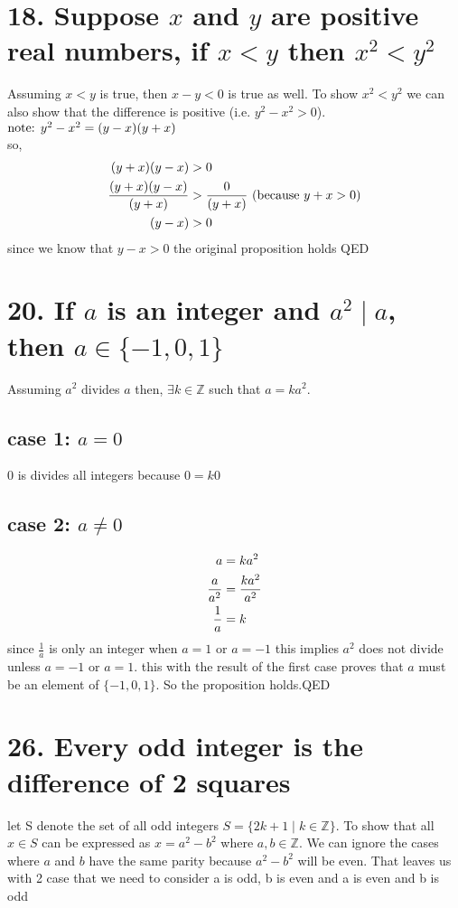 \documentclass{article}
\begin{document}
\section*{18. Suppose $x$ and $y$ are positive real numbers, if $x < y$ then $x^2 < y^2 $ }
Assuming $x < y $ is true, then $x-y < 0$ is true as well. To show $x^2 < y^2$ we can also show that the difference is positive (i.e. $y^2-x^2>0$).
 $\text{note: \hfil} y^2-x^2 =(y-x)(y+x)$ \\
 so,  
\begin{equation}\notag
 	\begin{aligned}
 		(y+x)(y-x)&>0\\
 		\frac{(y+x)(y-x)}{(y+x)}&>\frac{0}{(y+x)} \text{ (because $y+x>0$)}\\
 		(y-x)&>0\\
 	\end{aligned}
\end{equation}
 	since we know that $y-x > 0$ the original proposition holds \hfill QED
  
\section*{20. If $a$ is an integer and $a^2 \mid a$, then $a \in \lbrace -1,0,1\rbrace$ }
Assuming $a^2$ divides $a$ then, $\exists k \in \mathbb{Z}$ such that $a = ka^2$.
\subsection*{case 1: $a = 0$} 
0 is divides all integers because $0 = k0$

\subsection*{case 2: $a \not= 0$}
\begin{equation}\notag
		\begin{aligned}
		a &= ka^2\\
		\frac{a}{a^2} &= \frac{ka^2}{a^2}\\
		\frac{1}{a} &= k\\
		\end{aligned}
	\end{equation}
since $\frac{1}{a}$ is only an integer when $a = 1$ or $a=-1$  this implies $a^2$ does not divide unless $a = -1 \text{ or } a = 1$. this with the result of the first case proves that $a$ must be an element of $\lbrace -1,0,1 \rbrace$. So the proposition holds.\hfill QED
\section*{26. Every odd integer is the difference of 2 squares}
let S denote the set of all odd integers $S = \lbrace 2k+1 \mid k \in \mathbb{Z} \rbrace$. To show that all $x \in S$ can be expressed as $x=a^2-b^2$ where $a,b \in \mathbb{Z}$. We can ignore the cases where $a$ and $b$ have the same parity because $a^2-b^2$ will be even. That leaves us with 2 case that we need to consider a is odd, b is even and a is even and b is odd 
\end{document}
